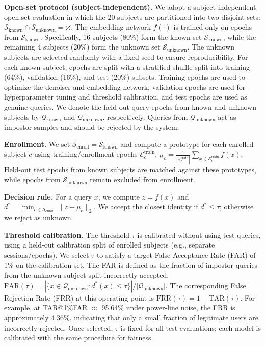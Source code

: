 \documentclass[a4paper,conference]{IEEEtran}
\begin{document}
	\textbf{Open-set protocol (subject-independent).}
	We adopt a subject-independent open-set evaluation in which the 20 subjects are partitioned into two disjoint sets:
	$\mathcal{S}_{\text{known}} \cap \mathcal{S}_{\text{unknown}}=\varnothing$.
	The embedding network $f(\cdot)$ is trained only on epochs from $\mathcal{S}_{\text{known}}$.
	Specifically, 16 subjects (80\%) form the known set $\mathcal{S}_{\text{known}}$, while the remaining 4 subjects (20\%) form the unknown set $\mathcal{S}_{\text{unknown}}$. The unknown subjects are selected randomly with a fixed seed to ensure reproducibility. For each known subject, epochs are split with a stratified shuffle split into training (64\%), validation (16\%), and test (20\%) subsets. Training epochs are used to optimize the denoiser and embedding network, validation epochs are used for hyperparameter tuning and threshold calibration, and test epochs are used as genuine queries. We denote the held-out query epochs from known and unknown subjects by $\mathcal{Q}_{\text{known}}$ and $\mathcal{Q}_{\text{unknown}}$, respectively. Queries from $\mathcal{Q}_{\text{unknown}}$ act as impostor samples and should be rejected by the system.

	\textbf{Enrollment.} We set $\mathcal{S}_{\text{enroll}}=\mathcal{S}_{\text{known}}$ and compute
	a prototype for each enrolled subject $c$ using training/enrollment epochs $\mathcal{E}_c^{\text{train}}$:
	$\mu_c=\frac{1}{|\mathcal{E}_c^{\text{train}}|}\sum_{x\in\mathcal{E}_c^{\text{train}}} f(x)$.
	Held-out test epochs from known subjects are matched against these prototypes, while epochs from $\mathcal{S}_{\text{unknown}}$ remain excluded from enrollment.

	\textbf{Decision rule.} For a query $x$, we compute $z=f(x)$ and
	$d^*=\min_{c\in\mathcal{S}_{\text{enroll}}}\|z-\mu_c\|_2$.
	We accept the closest identity if $d^*\le \tau$; otherwise we reject as unknown.

	\textbf{Threshold calibration.} The threshold $\tau$ is calibrated without using test queries,
	using a held-out calibration split of enrolled subjects (e.g., separate sessions/epochs).
	We select $\tau$ to satisfy a target False Acceptance Rate (FAR) of 1\% on the calibration set. The FAR is defined as the fraction of impostor queries from the unknown-subject split incorrectly accepted:
	$\text{FAR}(\tau) = |\{x \in \mathcal{Q}_{\text{unknown}} : d^*(x) \leq \tau\}| / |\mathcal{Q}_{\text{unknown}}|$.
	The corresponding False Rejection Rate (FRR) at this operating point is $\text{FRR}(\tau) = 1 - \text{TAR}(\tau)$. For example, at TAR@1\%FAR $\approx$ 95.64\% under power-line noise, the FRR is approximately 4.36\%, indicating that only a small fraction of legitimate users are incorrectly rejected.
	Once selected, $\tau$ is fixed for all test evaluations; each model is calibrated with the same procedure for fairness.
	
\end{document}

